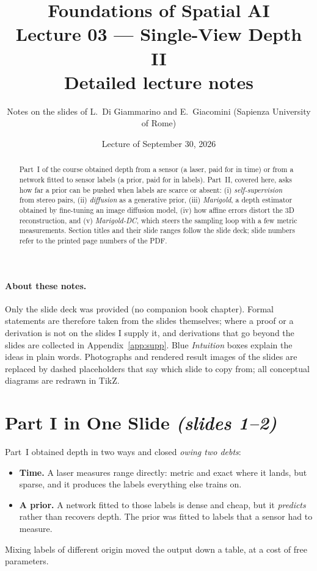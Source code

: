 \documentclass[11pt,a4paper]{article}
\title{\textbf{Foundations of Spatial AI}\\[2pt] Lecture 03 --- Single-View Depth II\\[2pt]\large Detailed lecture notes}
\author{Notes on the slides of L.~Di Giammarino and E.~Giacomini (Sapienza University of Rome)}
\date{Lecture of September 30, 2026}
\newcommand{\slides}[1]{\texorpdfstring{\emph{(slides #1)}}{(slides #1)}}
\theoremstyle{plain}
\theoremstyle{definition}
\numberwithin{equation}{section}
\begin{document}
\maketitle

\begin{abstract}\noindent
Part~I of the course obtained depth from a sensor (a laser, paid for in time) or from a network fitted to sensor labels (a prior, paid for in labels). Part~II, covered here, asks how far a prior can be pushed when labels are scarce or absent: (i) \emph{self-supervision} from stereo pairs, (ii) \emph{diffusion} as a generative prior, (iii) \emph{Marigold}, a depth estimator obtained by fine-tuning an image diffusion model, (iv) how affine errors distort the 3D reconstruction, and (v) \emph{Marigold-DC}, which steers the sampling loop with a few metric measurements. Section titles and their slide ranges follow the slide deck; slide numbers refer to the printed page numbers of the PDF.
\end{abstract}

\paragraph{About these notes.} Only the slide deck was provided (no companion book chapter). Formal statements are therefore taken from the slides themselves; where a proof or a derivation is not on the slides I supply it, and derivations that go beyond the slides are collected in Appendix~\ref{app:supp}. Blue \emph{Intuition} boxes explain the ideas in plain words. Photographs and rendered result images of the slides are replaced by dashed placeholders that say which slide to copy from; all conceptual diagrams are redrawn in TikZ.

\tableofcontents
\newpage

\section{Part I in One Slide \slides{1--2}}
Part~I obtained depth in two ways and closed \emph{owing two debts}:
\begin{itemize}[nosep]
  \item \textbf{Time.} A laser measures range directly: metric and exact where it lands, but sparse, and it produces the labels everything else trains on.
  \item \textbf{A prior.} A network fitted to those labels is dense and cheap, but it \emph{predicts} rather than recovers depth. The prior was fitted to labels that a sensor had to measure.
\end{itemize}
Mixing labels of different origin moved the output down a table, at a cost of free parameters.
\end{document}
